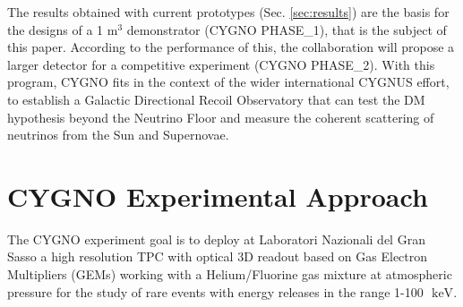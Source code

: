 \documentclass[physics,article,submit,moreauthors,pdftex]{Definitions/mdpi}
\newcommand{\keV}{\ensuremath{\,\textrm{keV}}\xspace}
\begin{document}
The results obtained with current prototypes (Sec. \ref{sec:results}) 
are the basis for the designs of a 1 m$^3$ demonstrator (CYGNO PHASE\_1), that is the subject of this paper. 
According to the performance of this, the collaboration will propose a larger detector for a competitive experiment (CYGNO PHASE\_2).
With this program, CYGNO fits in the context of the wider international CYGNUS effort, to establish a Galactic Directional Recoil Observatory that can test the DM hypothesis beyond the Neutrino Floor and measure the coherent scattering of neutrinos from the Sun and Supernovae\cite{Vahsen:2020pzb}.




\section{CYGNO Experimental Approach}\label{sec:project}

The CYGNO experiment goal is to deploy at Laboratori Nazionali del Gran Sasso a high resolution TPC with optical 3D readout based on Gas Electron Multipliers (GEMs) working with a Helium/Fluorine gas mixture at atmospheric pressure for the study of rare events with energy releases in the range 1-100~\keV.
\end{document}
